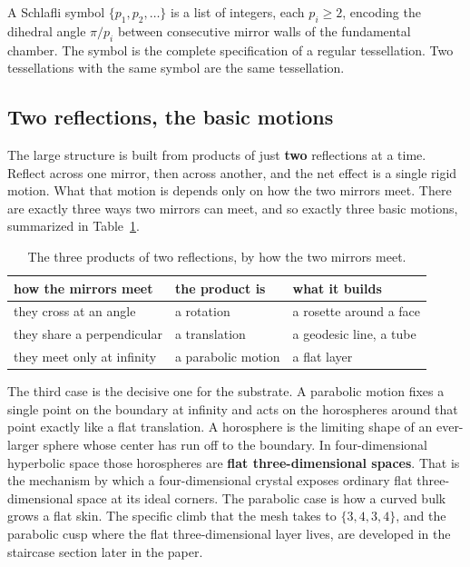 \begin{definition}
A Schlafli symbol $\{p_1, p_2, \dots\}$ is a list of integers, each $p_i \geq 2$, encoding the dihedral angle $\pi / p_i$ between consecutive mirror walls of the fundamental chamber. The symbol is the complete specification of a regular tessellation. Two tessellations with the same symbol are the same tessellation.
\end{definition}

\subsection{Two reflections, the basic motions}

The large structure is built from products of just \textbf{two} reflections at a time. Reflect across one mirror, then across another, and the net effect is a single rigid motion. What that motion is depends only on how the two mirrors meet. There are exactly three ways two mirrors can meet, and so exactly three basic motions, summarized in Table~\ref{tab:two-reflections}.

\begin{table}[ht]
\centering
\begin{tabular}{@{}lll@{}}
\toprule
how the mirrors meet & the product is & what it builds \\
\midrule
they cross at an angle & a rotation & a rosette around a face \\
they share a perpendicular & a translation & a geodesic line, a tube \\
they meet only at infinity & a parabolic motion & a flat layer \\
\bottomrule
\end{tabular}
\caption{The three products of two reflections, by how the two mirrors meet.}
\label{tab:two-reflections}
\end{table}

The third case is the decisive one for the substrate. A parabolic motion fixes a single point on the boundary at infinity and acts on the horospheres around that point exactly like a flat translation. A horosphere is the limiting shape of an ever-larger sphere whose center has run off to the boundary. In four-dimensional hyperbolic space those horospheres are \textbf{flat three-dimensional spaces}. That is the mechanism by which a four-dimensional crystal exposes ordinary flat three-dimensional space at its ideal corners. The parabolic case is how a curved bulk grows a flat skin. The specific climb that the mesh takes to $\{3,4,3,4\}$, and the parabolic cusp where the flat three-dimensional layer lives, are developed in the staircase section later in the paper.

